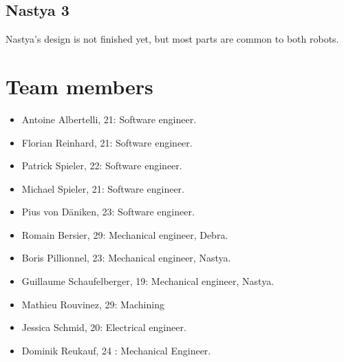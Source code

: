 \documentclass[a4paper]{paper}
\begin{document}
\subsection{Nastya 3}
Nastya's design is not finished yet, but most parts are common to both robots.

\section{Team members}
\begin{itemize}
    \item Antoine Albertelli, 21: Software engineer.
    \item Florian Reinhard, 21:  Software engineer.
    \item Patrick Spieler, 22:  Software engineer.
    \item Michael Spieler, 21:  Software engineer.
    \item Pius von Däniken, 23:  Software engineer.
    \item Romain Bersier, 29:  Mechanical engineer, Debra.
    \item Boris Pillionnel, 23:  Mechanical engineer, Nastya.
    \item Guillaume Schaufelberger, 19: Mechanical engineer, Nastya.
    \item Mathieu Rouvinez, 29:  Machining
    \item Jessica Schmid, 20: Electrical engineer.
    \item Dominik Reukauf, 24 : Mechanical Engineer.
\end{itemize}

\clearpage


\end{document}

